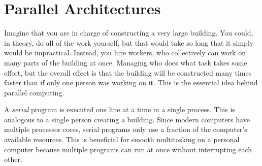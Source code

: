 \labdependencies{}

\section*{Parallel Architectures} %
Imagine that you are in charge of constructing a very large building.
You could, in theory, do all of the work yourself, but that would take so long that it simply would be impractical.
Instead, you hire workers, who collectively can work on many parts of the building at once.
Managing who does what task takes some effort, but the overall effect is that the building will be constructed many times faster than if only one person was working on it.
This is the essential idea behind parallel computing.

A \emph{serial} program is executed one line at a time in a single process.
This is analogous to a single person creating a building.
Since modern computers have multiple processor cores, serial programs only use a fraction of the computer's available resources.
This is beneficial for smooth multitasking on a personal computer because multiple programs can run at once without interrupting each other.

